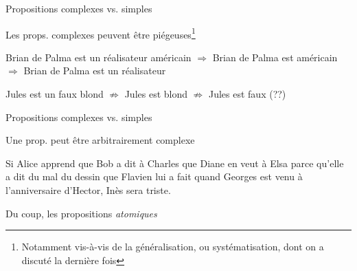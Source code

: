 \begin{frame}
	Propositions complexes vs. simples \newline

	
	\begin{description}[labelindent=6pt,style=multiline,leftmargin=1.3in]
		 \setlength\itemsep{1.4em}

\item[Remarque] Les props. complexes peuvent être piégeuses\footnote{Notamment vis-à-vis de la généralisation, ou systématisation, dont on a discuté la dernière fois}\pause
\item[Exemple] Brian de Palma est un réalisateur américain \pause
\newline $\Rightarrow$ Brian de Palma est américain \pause
\newline $\Rightarrow$ Brian de Palma est un réalisateur\pause
\item[vs.] Jules est un faux blond \pause
\newline $\not\Rightarrow$ Jules est blond \pause
\newline $\not\Rightarrow$ Jules est faux (??)

\end{description}
\end{frame}



\begin{frame}
	Propositions complexes vs. simples \newline

	
	\begin{description}[labelindent=6pt,style=multiline,leftmargin=1.3in]
		 \setlength\itemsep{1.4em}

\item[Remarque] Une prop. peut être arbitrairement complexe \pause
\item[Exemple] Si Alice apprend que Bob a dit à Charles que Diane en veut à Elsa parce qu'elle a dit du mal du dessin que Flavien lui a fait quand Georges est venu à l'anniversaire d'Hector, Inès sera triste. \pause
\item[Props. simples] Du coup, les propositions \textit{atomiques}

\end{description}
\end{frame}



